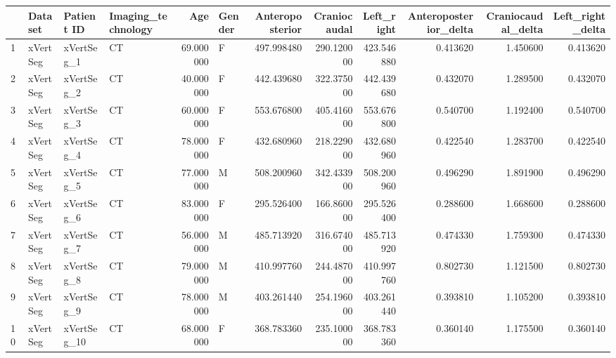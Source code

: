 \begin{tabular}{llllrlrrrrrr}
\toprule
{} &         Dataset &   Patient ID & Imaging\_technology &        Age &   Gender &  Anteroposterior &  Craniocaudal &  Left\_right &  Anteroposterior\_delta &  Craniocaudal\_delta &  Left\_right\_delta \\
\midrule
1      &        xVertSeg &   xVertSeg\_1 &                 CT &  69.000000 &        F &       497.998480 &    290.120000 &  423.546880 &               0.413620 &            1.450600 &          0.413620 \\
2      &        xVertSeg &   xVertSeg\_2 &                 CT &  40.000000 &        F &       442.439680 &    322.375000 &  442.439680 &               0.432070 &            1.289500 &          0.432070 \\
3      &        xVertSeg &   xVertSeg\_3 &                 CT &  60.000000 &        F &       553.676800 &    405.416000 &  553.676800 &               0.540700 &            1.192400 &          0.540700 \\
4      &        xVertSeg &   xVertSeg\_4 &                 CT &  78.000000 &        F &       432.680960 &    218.229000 &  432.680960 &               0.422540 &            1.283700 &          0.422540 \\
5      &        xVertSeg &   xVertSeg\_5 &                 CT &  77.000000 &        M &       508.200960 &    342.433900 &  508.200960 &               0.496290 &            1.891900 &          0.496290 \\
6      &        xVertSeg &   xVertSeg\_6 &                 CT &  83.000000 &        F &       295.526400 &    166.860000 &  295.526400 &               0.288600 &            1.668600 &          0.288600 \\
7      &        xVertSeg &   xVertSeg\_7 &                 CT &  56.000000 &        M &       485.713920 &    316.674000 &  485.713920 &               0.474330 &            1.759300 &          0.474330 \\
8      &        xVertSeg &   xVertSeg\_8 &                 CT &  79.000000 &        M &       410.997760 &    244.487000 &  410.997760 &               0.802730 &            1.121500 &          0.802730 \\
9      &        xVertSeg &   xVertSeg\_9 &                 CT &  78.000000 &        M &       403.261440 &    254.196000 &  403.261440 &               0.393810 &            1.105200 &          0.393810 \\
10     &        xVertSeg &  xVertSeg\_10 &                 CT &  68.000000 &        F &       368.783360 &    235.100000 &  368.783360 &               0.360140 &            1.175500 &          0.360140 \\

\end{tabular}
